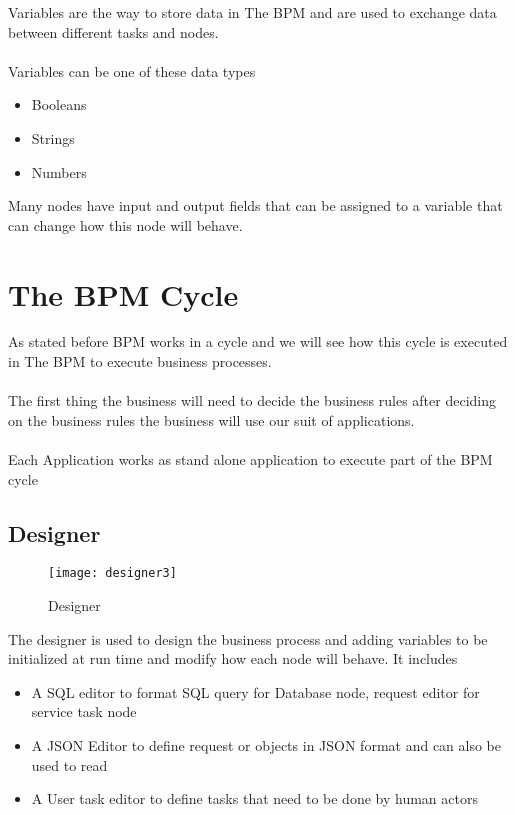 Variables are the way to store data in The BPM and are used to exchange data between different tasks
and nodes.\\\\
Variables can be one of these data types
\begin{itemize}
    \item Booleans
    \item Strings
    \item Numbers
\end{itemize}
Many nodes have input and output fields that can be assigned to a variable that can change how this
node will behave.

\section{The BPM Cycle}

As stated before BPM works in a cycle and we will see how this cycle is executed in The BPM to execute business processes.
\\\\
The first thing the business will need to decide the business rules after deciding on the business rules the business will use our suit of applications.\\\\
Each Application works as stand alone application to execute part of the BPM cycle

\subsection{Designer}
\begin{figure}[h]
    \texttt{[image: designer3]}
    \centering
    \caption{Designer}
    \label{fig:designer}
\end{figure}

The designer is used to design the business process and adding variables to be initialized at run time
and modify how each node will behave.
It includes

\begin{itemize}
    \item A SQL editor to format SQL query for Database node, request editor for service task node
    \item A JSON Editor to define request or objects in JSON format and can also be used to read
    \item A User task editor to define tasks that need to be done by human actors
\end{itemize}

